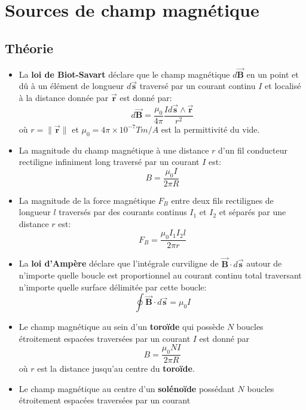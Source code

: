 \documentclass[a4paper]{article}
\begin{document}
\section{Sources de champ magnétique}











\subsection{Théorie}







\begin{itemize}
    \item La \textbf{loi de Biot-Savart} déclare que le champ magnétique $ d \vec{\textbf{B}} $ en un point et dû à un élément de longueur
$ d \vec{\textbf{s}} $ traversé par un courant continu $ I $ et localisé à la distance donnée par $ \vec{\textbf{r}} $ est donné par: 
\[ d \vec{\textbf{B}} = \frac{\mu_0}{4 \pi} \frac{I d \vec{\textbf{s}} \wedge \vec{\textbf{r}}}{r^2} \]
où $ r = \| \vec{\textbf{r}} \| $ et $ \mu_0 = 4 \pi \times 10^{-7} T m / A $ est la permittivité du vide.
    \item La magnitude du champ magnétique à une distance $ r $ d'un fil conducteur rectiligne infiniment long traversé par un courant $ I
$ est: \[ B = \frac{\mu_0 I}{2 \pi R} \]
    \item La magnitude de la force magnétique $ F_B $ entre deux fils rectilignes de longueur $ l $ traversés par des courants continus 
$ I_1 $ et $ I_2 $ et séparés par une distance $ r $ est: 
\[ F_B = \frac{\mu_0 I_1 I_2 l}{2 \pi r} \]
    \item La \textbf{loi d'Ampère} déclare que l'intégrale curviligne de $ \vec{\textbf{B}} \cdot d \vec{\textbf{s}} $ autour de n'importe
quelle boucle est proportionnel au courant continu total traversant n'importe quelle surface délimitée par cette boucle: 
\[ \oint \vec{\textbf{B}} \cdot d \vec{\textbf{s}} = \mu_0 I \]
     \item Le champ magnétique au sein d'un \textbf{toroïde} qui possède $ N $ boucles étroitement espacées traversées par un courant 
$ I $ est donné par \[ B = \frac{\mu_0 N I}{2 \pi R} \]
où $ r $ est la distance jusqu'au centre du \textbf{toroïde}.
    \item Le champ magnétique au centre d'un \textbf{solénoïde} possédant $ N $ boucles étroitement espacées traversées par un courant 

\end{itemize}
\end{document}
